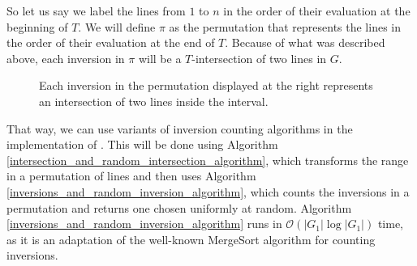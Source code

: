 \documentclass{article}
\def\bigo{\mathcal{O}}
\begin{document}
So let us say we label the lines from $1$ to $n$ in the order of their evaluation at the beginning of $T$. We will define $\pi$ as the permutation that represents the lines in the order of their evaluation at the end of $T$. Because of what was described above, each inversion in $\pi$ will be a $T$-intersection of two lines in $G$.

\begin{figure}[!htbp]%
    \centering

\caption*{Each inversion in the permutation displayed at the right represents an intersection of two lines inside the interval.} 
\end{figure}

That way, we can use variants of inversion counting algorithms in the implementation of \IntersectionsAndRandomIntersection. This will be done using Algorithm \ref{intersection_and_random_intersection_algorithm}, which transforms the range in a permutation of lines and then uses Algorithm \ref{inversions_and_random_inversion_algorithm}, which counts the inversions in a permutation and returns one chosen uniformly at random. Algorithm \ref{inversions_and_random_inversion_algorithm} runs in $\bigo(|G_1| \log |G_1|)$ time, as it is an adaptation of the well-known MergeSort algorithm for counting inversions.
\end{document}
